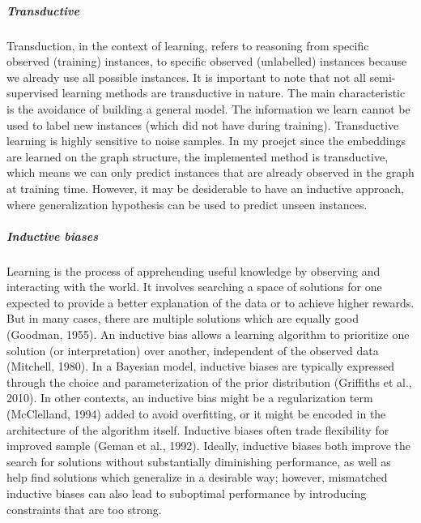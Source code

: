 \documentclass{report}
\begin{document}
\subparagraph{Transductive} Transduction, in the context of learning, refers to reasoning from specific observed (training) instances, to specific observed (unlabelled) instances because we already use all possible instances. It is important to note that not all semi-supervised learning methods are transductive in nature. The main characteristic is the avoidance of building a general model. The information we learn cannot be used to label new instances (which did not have during training). Transductive learning is highly sensitive to noise samples. In my proejct since the embeddings are learned on the graph structure, the implemented method is transductive, which means we can only predict instances that are already observed in the graph at training time. However, it may be desiderable to have an inductive approach, where generalization hypothesis can be used to predict unseen instances.

\subparagraph{Inductive biases}
Learning is the process of apprehending useful knowledge by observing and interacting with the
world. It involves searching a space of solutions for one expected to provide a better explanation
of the data or to achieve higher rewards. But in many cases, there are multiple solutions which
are equally good (Goodman, 1955). An inductive bias allows a learning algorithm to prioritize
one solution (or interpretation) over another, independent of the observed data (Mitchell,
1980). In a Bayesian model, inductive biases are typically expressed through the choice and
parameterization of the prior distribution (Griffiths et al., 2010). In other contexts, an inductive
bias might be a regularization term (McClelland, 1994) added to avoid overfitting, or it might
be encoded in the architecture of the algorithm itself. Inductive biases often trade flexibility
for improved sample%
(Geman et al., 1992). Ideally, inductive biases both improve the search for solutions without
substantially diminishing performance, as well as help find solutions which generalize in a
desirable way; however, mismatched inductive biases can also lead to suboptimal performance
by introducing constraints that are too strong.\cite{ind_BIAS}
\end{document}
